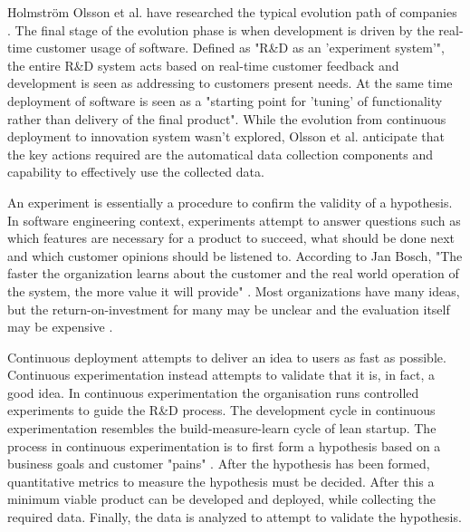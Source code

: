\documentclass[english]{tktltiki2}
\theoremstyle{definition}
\theoremstyle{remark}
\begin{document}
Holmström Olsson et al. have researched the typical evolution path of companies \cite{olsson2012climbing}. The final stage of the evolution phase is when development is driven by the real-time customer usage of software. Defined as "R\&D as an 'experiment system'", the entire R\&D system acts based on real-time customer feedback and development is seen as addressing to customers present needs. At the same time deployment of software is seen as a "starting point for 'tuning' of functionality rather than delivery of the final product". While the evolution from continuous deployment to innovation system wasn't explored, Olsson et al. anticipate that the key actions required are the automatical data collection components and capability to effectively use the collected data.


An experiment is essentially a procedure to confirm the validity of a hypothesis. In software engineering context, experiments attempt to answer questions such as which features are necessary for a product to succeed, what should be done next and which customer opinions should be listened to. According to Jan Bosch, "The faster the organization learns about the customer and the real world operation of the system, the more value it will provide" \cite{bosch2012building}. Most organizations have many ideas, but the return-on-investment for many may be unclear and the evaluation itself may be expensive \cite{kohavi2007practical}. 

Continuous deployment attempts to deliver an idea to users as fast as possible. Continuous experimentation instead attempts to validate that it is, in fact, a good idea. In continuous experimentation the organisation runs controlled experiments to guide the R\&D process. The development cycle in continuous experimentation resembles the build-measure-learn cycle of lean startup. The process in continuous experimentation is to first form a hypothesis based on a business goals and customer "pains" \cite{bosch2012building}. After the hypothesis has been formed, quantitative metrics to measure the hypothesis must be decided. After this a minimum viable product can be developed and deployed, while collecting the required data. Finally, the data is analyzed to attempt to validate the hypothesis.
\end{document}
